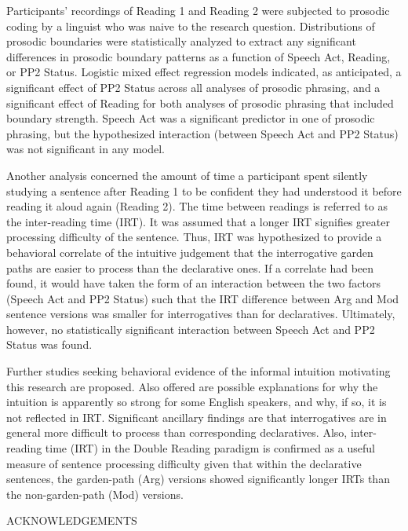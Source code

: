\documentclass[11pt,oneside]{book}
\begin{document}
Participants' recordings of Reading 1 and Reading 2 were subjected to prosodic coding by a linguist who was naive to the research question. Distributions of prosodic boundaries were statistically analyzed to extract any significant differences in prosodic boundary patterns as a function of Speech Act, Reading, or PP2 Status. Logistic mixed effect regression models indicated, as anticipated, a significant effect of PP2 Status across all analyses of prosodic phrasing, and a significant effect of Reading for both analyses of prosodic phrasing that included boundary strength. Speech Act was a significant predictor in one of prosodic phrasing, but the hypothesized interaction (between Speech Act and PP2 Status) was not significant in any model.

Another analysis concerned the amount of time a participant spent silently studying a sentence after Reading 1 to be confident they had understood it before reading it aloud again (Reading 2). The time between readings is referred to as the inter-reading time (IRT). It was assumed that a longer IRT signifies greater processing difficulty of the sentence. Thus, IRT was hypothesized to provide a behavioral correlate of the intuitive judgement that the interrogative garden paths are easier to process than the declarative ones. If a correlate had been found, it would have taken the form of an interaction between the two factors (Speech Act and PP2 Status) such that the IRT difference between Arg and Mod sentence versions was smaller for interrogatives than for declaratives.  Ultimately, however, no statistically significant interaction between Speech Act and PP2 Status was found. 

Further studies seeking behavioral evidence of the informal intuition motivating this research are proposed. Also offered are possible explanations for why the intuition is apparently so strong for some English speakers, and why, if so, it is not reflected in IRT. Significant ancillary findings are that interrogatives are in general more difficult to process than corresponding declaratives. Also, inter-reading time (IRT) in the Double Reading paradigm is confirmed as a useful measure of sentence processing difficulty given that within the declarative sentences, the garden-path (Arg) versions showed significantly longer IRTs than the non-garden-path (Mod) versions. 

\pagebreak

\centering 

ACKNOWLEDGEMENTS
\end{document}
